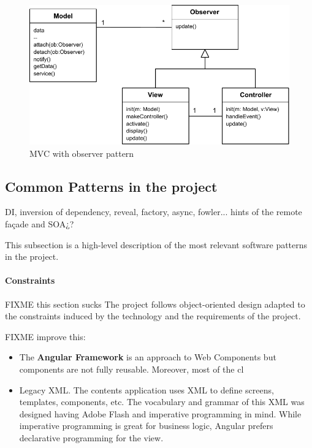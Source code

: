 \begin{figure}[htb]
    \centering
    \includegraphics{figures/design-patterns-mvc-2.pdf}
    \caption{MVC with observer pattern}
    \label{fig:mvc-with-observer}
\end{figure}

\subsection{Common Patterns in the project}
DI, inversion of dependency, reveal, factory, async, fowler... hints of the remote façade and SOA¿?

This subsection is a high-level description of the most relevant software patterns in the project.

\paragraph{Constraints}
FIXME this section sucks 
The project follows object-oriented design adapted to the constraints induced by the technology and the requirements of the project.

FIXME improve this:
\begin{itemize}
    \item The \textbf{Angular Framework} is an approach to Web Components but components are not fully reusable. Moreover, most of the cl
    \item  Legacy \ac{XML}. The contents application uses \ac{XML} to define screens, templates, components, etc. The vocabulary and grammar of this \ac{XML} was designed having Adobe Flash and imperative programming in mind. While imperative programming is great for business logic, Angular prefers declarative programming for the view. 
\end{itemize}

